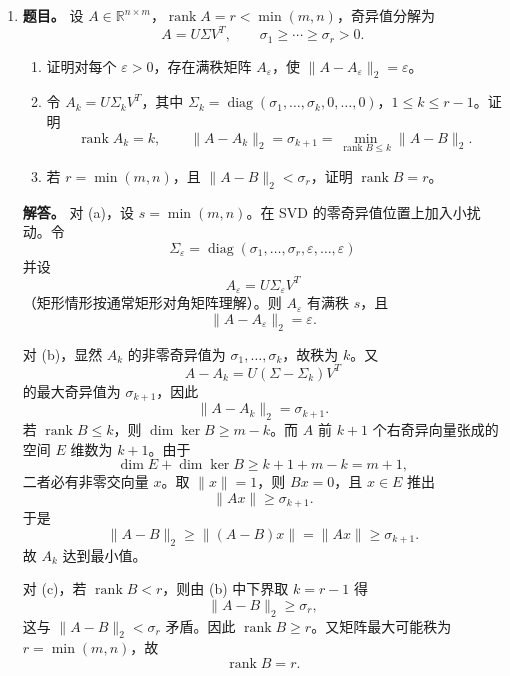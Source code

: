 ﻿\documentclass[UTF8,12pt]{ctexart}
\begin{document}
\begin{enumerate}[label=\textbf{\arabic*.},leftmargin=2.2em]
\textbf{解答。} 曲线长度为
\[
L=\int_0^T\sqrt{x'(t)^2+y'(t)^2}\,dt.
\]
这是弧长微元 \(ds=\sqrt{x'^2+y'^2}\,dt\) 的积分。面积由 Green 公式得到：
\[
A=\frac12\int_0^T\bigl(x(t)y'(t)-y(t)x'(t)\bigr)\,dt.
\]

等周问题可写为：在约束
\[
\int_0^T\sqrt{x'^2+y'^2}\,dt=L_0
\]
下最大化
\[
\frac12\int_0^T(xy'-yx')\,dt.
\]
引入 Lagrange 乘子 \(\lambda\)，考虑泛函
\[
\mathcal F=\int_0^T
\left[
\frac12(xy'-yx')-\lambda\sqrt{x'^2+y'^2}
\right]dt.
\]
可用弧长参数 \(s\)，使 \(\sqrt{x_s^2+y_s^2}=1\)。Euler--Lagrange 方程等价于曲率为常数。直接写出变分方程可得
\[
y_s+\lambda x_{ss}=0,\qquad
-x_s+\lambda y_{ss}=0.
\]
于是
\[
x_{ss}=-\frac1\lambda y_s,\qquad
y_{ss}=\frac1\lambda x_s.
\]
这说明单位切向量以常角速度旋转，曲率
\[
\kappa=\frac1{|\lambda|}
\]
为常数。平面闭曲线中常正曲率的极值曲线为圆。因此存在常数 \(x_0,y_0\)，使
\[
(x-x_0)^2+(y-y_0)^2=r^2.
\]
由圆的周长 \(L=2\pi r\)，得到
\[
r=\frac{L}{2\pi}.
\]
这正说明固定周长下圆给出最大面积。

\item \textbf{题目。} 设 \(A\in\mathbb R^{n\times m}\)，\(\operatorname{rank}A=r<\min(m,n)\)，奇异值分解为
\[
A=U\Sigma V^T,\qquad \sigma_1\ge\cdots\ge\sigma_r>0.
\]
\begin{enumerate}[label=(\alph*),leftmargin=2.0em]
\item 证明对每个 \(\varepsilon>0\)，存在满秩矩阵 \(A_\varepsilon\)，使 \(\|A-A_\varepsilon\|_2=\varepsilon\)。
\item 令 \(A_k=U\Sigma_kV^T\)，其中 \(\Sigma_k=\operatorname{diag}(\sigma_1,\ldots,\sigma_k,0,\ldots,0)\)，\(1\le k\le r-1\)。证明
\[
\operatorname{rank}A_k=k,\qquad
\|A-A_k\|_2=\sigma_{k+1}
=\min_{\operatorname{rank}B\le k}\|A-B\|_2.
\]
\item 若 \(r=\min(m,n)\)，且 \(\|A-B\|_2<\sigma_r\)，证明 \(\operatorname{rank}B=r\)。
\end{enumerate}

\textbf{解答。} 对 (a)，设 \(s=\min(m,n)\)。在 SVD 的零奇异值位置上加入小扰动。令
\[
\Sigma_\varepsilon=\operatorname{diag}(\sigma_1,\ldots,\sigma_r,\varepsilon,\ldots,\varepsilon)
\]
并设
\[
A_\varepsilon=U\Sigma_\varepsilon V^T
\]
（矩形情形按通常矩形对角矩阵理解）。则 \(A_\varepsilon\) 有满秩 \(s\)，且
\[
\|A-A_\varepsilon\|_2=\varepsilon.
\]

对 (b)，显然 \(A_k\) 的非零奇异值为 \(\sigma_1,\ldots,\sigma_k\)，故秩为 \(k\)。又
\[
A-A_k=U(\Sigma-\Sigma_k)V^T
\]
的最大奇异值为 \(\sigma_{k+1}\)，因此
\[
\|A-A_k\|_2=\sigma_{k+1}.
\]
若 \(\operatorname{rank}B\le k\)，则 \(\dim\ker B\ge m-k\)。而 \(A\) 前 \(k+1\) 个右奇异向量张成的空间 \(E\) 维数为 \(k+1\)。由于
\[
\dim E+\dim\ker B\ge k+1+m-k=m+1,
\]
二者必有非零交向量 \(x\)。取 \(\|x\|=1\)，则 \(Bx=0\)，且 \(x\in E\) 推出
\[
\|Ax\|\ge\sigma_{k+1}.
\]
于是
\[
\|A-B\|_2\ge \|(A-B)x\|=\|Ax\|\ge\sigma_{k+1}.
\]
故 \(A_k\) 达到最小值。

对 (c)，若 \(\operatorname{rank}B<r\)，则由 (b) 中下界取 \(k=r-1\) 得
\[
\|A-B\|_2\ge\sigma_r,
\]
这与 \(\|A-B\|_2<\sigma_r\) 矛盾。因此 \(\operatorname{rank}B\ge r\)。又矩阵最大可能秩为 \(r=\min(m,n)\)，故
\[
\operatorname{rank}B=r.
\]
\end{enumerate}
\end{document}

